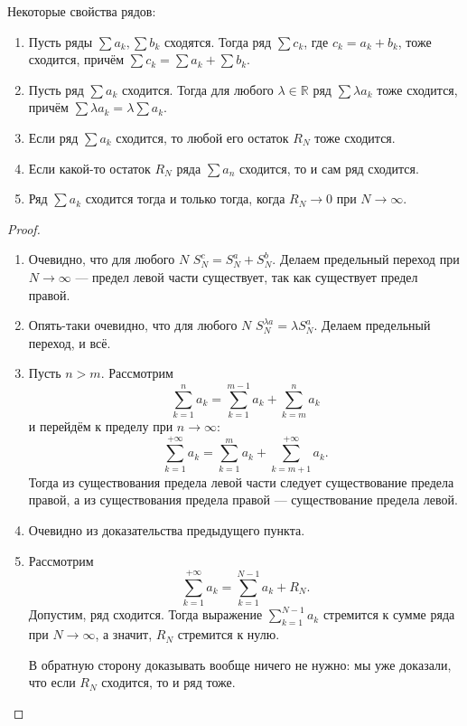 \begin{theorem} \hypertarget{свойства рядов}{}
	Некоторые свойства рядов:
	\begin{enumerate}
		\item Пусть ряды  \(\sum a_k, \sum b_k\) сходятся. Тогда ряд \(\sum c_k\), где \(c_k = a_k + b_k\), тоже сходится, причём \(\sum c_k = \sum a_k + \sum b_k\).
		\item Пусть ряд \(\sum a_k\) сходится. Тогда для любого \(\lambda \in \mathbb{R}\) ряд \(\sum \lambda a_k\) тоже сходится, причём \(\sum \lambda a_k = \lambda \sum a_k\).
		\item Если ряд \(\sum a_k\) сходится, то любой его остаток \(R_N\) тоже сходится.
		\item Если какой-то остаток \(R_N\) ряда \(\sum a_n\) сходится, то и сам ряд сходится.
		\item Ряд \(\sum a_k\) сходится тогда и только тогда, когда \(R_N \to 0\) при \(N \to \infty\).
	\end{enumerate}
\end{theorem}
\begin{proof}
	\begin{enumerate}
		\item Очевидно, что для любого \(N\) \(S_N^c = S_N^a + S_N^b\). Делаем предельный переход при \(N \to \infty\) --- предел левой части существует, так как существует предел правой.
		\item Опять-таки очевидно, что для любого \(N\) \(S_N^{\lambda a} = \lambda S_N^a\). Делаем предельный переход, и всё.
		\item Пусть \(n > m\). Рассмотрим \[
		\sum_{k=1}^{n} a_k = \sum_{k=1}^{m-1} a_k + \sum_{k=m}^{n} a_k
		\]
		и перейдём к пределу при \(n \to \infty\): \[
		\sum_{k=1}^{+\infty} a_k = \sum_{k=1}^{m} a_k + \sum_{k=m+1}^{+\infty} a_k.
		\]
		Тогда из существования предела левой части следует существование предела правой, а из существования предела правой --- существование предела левой.
		\item Очевидно из доказательства предыдущего пункта.
		\item Рассмотрим \[
		\sum_{k=1}^{+\infty} a_k = \sum_{k=1}^{N-1} a_k + R_N.
		\]
		Допустим, ряд сходится. Тогда выражение \(\sum\limits_{k=1}^{N-1} a_k\) стремится к сумме ряда при \(N \to \infty\), а значит, \(R_N\) стремится к нулю.
		
		В обратную сторону доказывать вообще ничего не нужно: мы уже доказали, что если \(R_N\) сходится, то и ряд тоже.
	\end{enumerate}
\end{proof}

